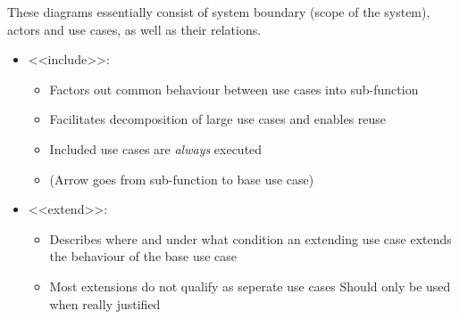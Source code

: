 \documentclass[
../../Software_Engineering_Summary.tex,
]
{subfiles}
\begin{document}
These diagrams essentially consist of system boundary (scope of the system), actors and use cases, as well as their relations.

\begin{defbox}
    \begin{itemize}
        \item <<include>>:
        \begin{itemize}
            \item Factors out common behaviour between use cases into sub-function
            \item Facilitates decomposition of large use cases and enables reuse
            \item Included use cases are \textit{always} executed
            \item (Arrow goes from sub-function to base use case)
        \end{itemize}
        \item <<extend>>:
        \begin{itemize}
            \item Describes where and under what condition an extending use case extends the behaviour of the base use case
            \item Most extensions do not qualify as seperate use cases \rightarrow Should only be used when really justified
        \end{itemize}
    \end{itemize}
\end{defbox}
\end{document}
